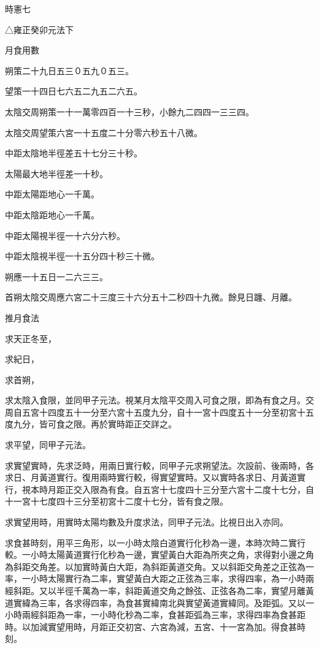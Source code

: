 
\begin{pinyinscope}
時憲七

△雍正癸卯元法下

月食用數

朔策二十九日五三０五九０五三。

望策一十四日七六五二九五二六五。

太陰交周朔策一十一萬零四百一十三秒，小餘九二四四一三三四。

太陰交周望策六宮一十五度二十分零六秒五十八微。

中距太陰地半徑差五十七分三十秒。

太陽最大地半徑差一十秒。

中距太陽距地心一千萬。

中距太陰距地心一千萬。

中距太陽視半徑一十六分六秒。

中距太陰視半徑一十五分四十秒三十微。

朔應一十五日一二六三三。

首朔太陰交周應六宮二十三度三十六分五十二秒四十九微。餘見日躔、月離。

推月食法

求天正冬至，

求紀日，

求首朔，

求太陰入食限，並同甲子元法。視某月太陰平交周入可食之限，即為有食之月。交周自五宮十四度五十一分至六宮十五度九分，自十一宮十四度五十一分至初宮十五度九分，皆可食之限。再於實時距正交詳之。

求平望，同甲子元法。

求實望實時，先求泛時，用兩日實行較，同甲子元求朔望法。次設前、後兩時，各求日、月黃道實行。復用兩時實行較，得實望實時。又以實時各求日、月黃道實行，視本時月距正交入限為有食。自五宮十七度四十三分至六宮十二度十七分，自十一宮十七度四十三分至初宮十二度十七分，皆有食之限。

求實望用時，用實時太陽均數及升度求法，同甲子元法。比視日出入亦同。

求食甚時刻，用平三角形，以一小時太陰白道實行化秒為一邊，本時次時二實行較。一小時太陽黃道實行化秒為一邊，實望黃白大距為所夾之角，求得對小邊之角為斜距交角差。以加實時黃白大距，為斜距黃道交角。又以斜距交角差之正弦為一率，一小時太陽實行為二率，實望黃白大距之正弦為三率，求得四率，為一小時兩經斜距。又以半徑千萬為一率，斜距黃道交角之餘弦、正弦各為二率，實望月離黃道實緯為三率，各求得四率，為食甚實緯南北與實望黃道實緯同。及距弧。又以一小時兩經斜距為一率，一小時化秒為二率，食甚距弧為三率，求得四率為食甚距時。以加減實望用時，月距正交初宮、六宮為減，五宮、十一宮為加。得食甚時刻。


\end{pinyinscope}
